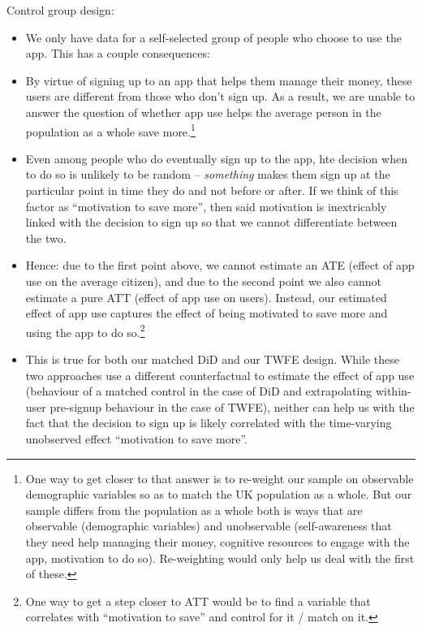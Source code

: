 Control group design:
\begin{itemize}

    \item We only have data for a self-selected group of people who choose to
        use the app. This has a couple consequences:

    \item By virtue of signing up to an app that helps them manage
        their money, these users are different from those who don't
        sign up. As a result, we are unable to answer the question of
        whether app use helps the average person in the
        population as a whole save more.\footnote{One way to get closer
            to that answer is to re-weight our sample on observable
            demographic variables so as to match the UK population as a
            whole. But our sample differs from the population as a
            whole both is ways that are observable (demographic
            variables) and unobservable (self-awareness that they need
            help managing their money, cognitive resources to engage
            with the app, motivation to do so). Re-weighting would only
            help us deal with the first of these.}

    \item Even among people who do eventually sign up to the app,
        hte decision when to do so is unlikely to be random --
        \textit{something} makes them sign up at the particular
        point in time they do and not before or after. If we think
        of this factor as ``motivation to save more'', then said
        motivation is inextricably linked with the decision to sign
        up so that we cannot differentiate between the two.

    \item Hence: due to the first point above, we cannot estimate
        an ATE (effect of app use on the average citizen), and due
        to the second point we also cannot estimate a pure ATT
        (effect of app use on users). Instead, our estimated effect
        of app use captures the effect of being motivated to save
        more and using the app to do so.\footnote{One way to get a
            step closer to ATT would be to find a variable that
        correlates with ``motivation to save'' and control for it /
    match on it.}

    \item This is true for both our matched DiD and our TWFE
        design. While these two approaches use a different
        counterfactual to estimate the effect of app use
        (behaviour of a matched control in the case of DiD and
        extrapolating within-user pre-signup behaviour in the case
        of TWFE), neither can help us with the fact that the
        decision to sign up is likely correlated with the
        time-varying unobserved effect ``motivation to save more''.

\end{itemize}

